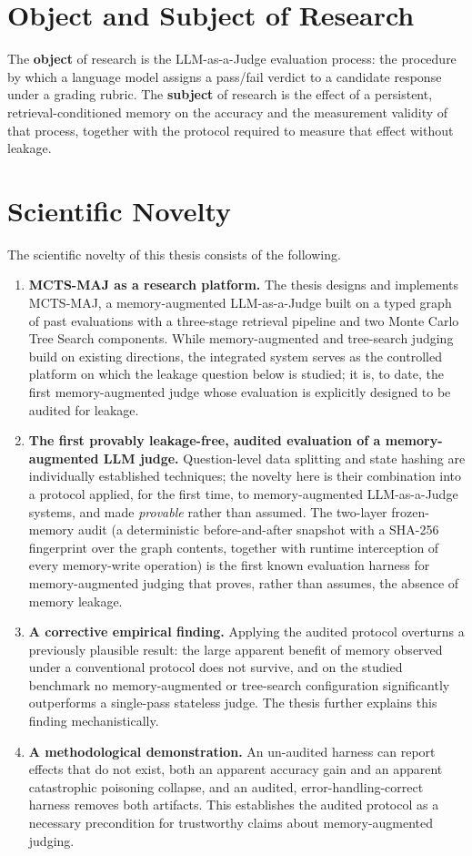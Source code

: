 \documentclass[14pt,a4paper]{extreport}
\begin{document}
\section{Object and Subject of Research}

The \textbf{object} of research is the LLM-as-a-Judge evaluation process: the procedure by which a language model assigns a pass/fail verdict to a candidate response under a grading rubric. The \textbf{subject} of research is the effect of a persistent, retrieval-conditioned memory on the accuracy and the measurement validity of that process, together with the protocol required to measure that effect without leakage.

\section{Scientific Novelty}

The scientific novelty of this thesis consists of the following.

\begin{enumerate}
    \item \textbf{MCTS-MAJ as a research platform.} The thesis designs and implements MCTS-MAJ, a memory-augmented LLM-as-a-Judge built on a typed graph of past evaluations with a three-stage retrieval pipeline and two Monte Carlo Tree Search components. While memory-augmented and tree-search judging build on existing directions, the integrated system serves as the controlled platform on which the leakage question below is studied; it is, to date, the first memory-augmented judge whose evaluation is explicitly designed to be audited for leakage.
    \item \textbf{The first provably leakage-free, audited evaluation of a memory-augmented LLM judge.} Question-level data splitting and state hashing are individually established techniques; the novelty here is their combination into a protocol applied, for the first time, to memory-augmented LLM-as-a-Judge systems, and made \emph{provable} rather than assumed. The two-layer frozen-memory audit (a deterministic before-and-after snapshot with a SHA-256 fingerprint over the graph contents, together with runtime interception of every memory-write operation) is the first known evaluation harness for memory-augmented judging that proves, rather than assumes, the absence of memory leakage.
    \item \textbf{A corrective empirical finding.} Applying the audited protocol overturns a previously plausible result: the large apparent benefit of memory observed under a conventional protocol does not survive, and on the studied benchmark no memory-augmented or tree-search configuration significantly outperforms a single-pass stateless judge. The thesis further explains this finding mechanistically.
    \item \textbf{A methodological demonstration.} An un-audited harness can report effects that do not exist, both an apparent accuracy gain and an apparent catastrophic poisoning collapse, and an audited, error-handling-correct harness removes both artifacts. This establishes the audited protocol as a necessary precondition for trustworthy claims about memory-augmented judging.
\end{enumerate}
\end{document}
